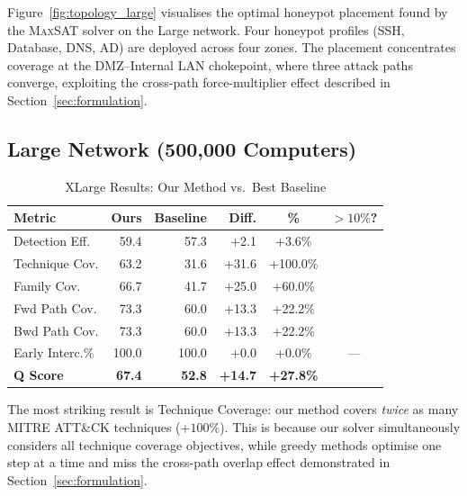\documentclass[journal]{IEEEtran}
\newcommand{\cmark}{\ding{51}}
\newcommand{\maxsat}{\textsc{MaxSAT}}
\begin{document}
Figure~\ref{fig:topology_large} visualises the optimal
honeypot placement found by the \maxsat{} solver on the
Large network.
Four honeypot profiles (SSH, Database, DNS, AD) are deployed
across four zones.
The placement concentrates coverage at the DMZ--Internal LAN
chokepoint, where three attack paths converge, exploiting the
cross-path force-multiplier effect described in
Section~\ref{sec:formulation}.

\subsection{Large Network (500,000 Computers)}

\begin{table}[htbp]
\caption{XLarge Results: Our Method vs.\ Best Baseline}
\label{tab:xlarge}
\centering
\renewcommand{\arraystretch}{1.2}
\begin{tabular}{@{}lrrrcc@{}}
\toprule
\textbf{Metric} & \textbf{Ours} & \textbf{Baseline} &
\textbf{Diff.} & \textbf{\%} & \textbf{$>10\%$?} \\
\midrule
Detection Eff.  & 59.4  & 57.3  & +2.1  & +3.6\%   & \cmark \\
Technique Cov.  & 63.2  & 31.6  & +31.6 & +100.0\% & \cmark \\
Family Cov.     & 66.7  & 41.7  & +25.0 & +60.0\%  & \cmark \\
Fwd Path Cov.   & 73.3  & 60.0  & +13.3 & +22.2\%  & \cmark \\
Bwd Path Cov.   & 73.3  & 60.0  & +13.3 & +22.2\%  & \cmark \\
Early Interc.\% & 100.0 & 100.0 & +0.0  & +0.0\%   & ---    \\
\midrule
\textbf{Q Score}& \textbf{67.4} & \textbf{52.8} &
  \textbf{+14.7} & \textbf{+27.8\%} & \cmark \\
\bottomrule
\end{tabular}
\end{table}

The most striking result is Technique Coverage: our method
covers \emph{twice} as many MITRE ATT\&CK techniques
($+100\%$).
This is because our solver simultaneously considers all
technique coverage objectives, while greedy methods optimise
one step at a time and miss the cross-path overlap effect
demonstrated in Section~\ref{sec:formulation}.
\end{document}
